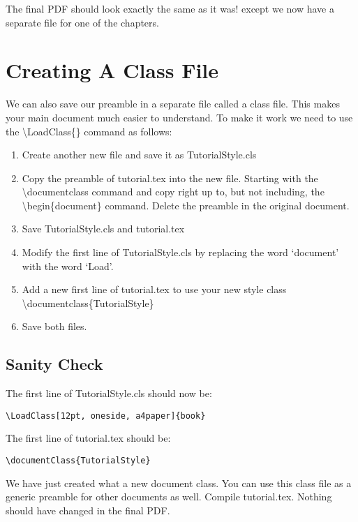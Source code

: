 The final PDF should look exactly the same as it was! except we now have a separate file for one of the chapters.

\pagebreak
\section{Creating A Class File}
We can also save our preamble in a separate file called a class file. This makes your main document much easier to understand.  To make it work we need to use the {\textbackslash}LoadClass\{\} command as follows:

\begin{enumerate}
\item Create another new file and save it as TutorialStyle.cls
\item Copy the preamble of tutorial.tex into the new file. Starting with the {\textbackslash}documentclass{} command and copy right up to, but not including, the {\textbackslash}begin\{document\} command. Delete the preamble in the original document.
\item Save TutorialStyle.cls and tutorial.tex
\item Modify the first line of TutorialStyle.cls by replacing the word `document' with the word `Load'.
\item Add a new first line of tutorial.tex to use your new style class {\textbackslash}documentclass\{TutorialStyle\}
\item Save both files.
\end{enumerate}

\subsection{Sanity Check}

The first line of TutorialStyle.cls should now be:

\begin{verbatim}
\LoadClass[12pt, oneside, a4paper]{book}
\end{verbatim}
\vspace{2ex}

The first line of tutorial.tex should be:

\begin{verbatim}
\documentClass{TutorialStyle}
\end{verbatim}
\vspace{2ex}

We have just created what a new document class. You can use this class file as a generic preamble for other documents as well. Compile tutorial.tex.  Nothing should have changed in the final PDF.


